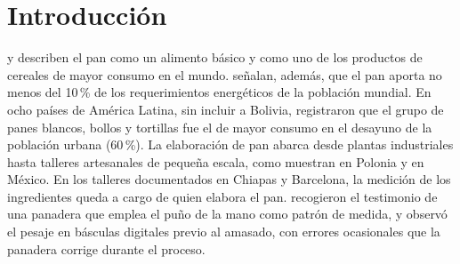 \raggedbottom

\chapter{Introducción}
\label{sec:introduction}


\textcite{ribet2025bread} y \textcite{allipour2023bread} describen el pan
como un alimento básico y como uno de los productos de cereales de mayor
consumo en el mundo. \textcite{ribet2025bread} señalan, además, que el pan
aporta no menos del 10\,\% de los requerimientos energéticos de la población
mundial. En ocho países de América Latina, sin incluir a Bolivia,
\textcite{kovalskys2022breakfast} registraron que el grupo de panes blancos,
bollos y tortillas fue el de mayor consumo en el desayuno de la población
urbana (60\,\%). La elaboración de pan abarca desde plantas industriales
hasta talleres artesanales de pequeña escala, como muestran
\textcite{drozd2023systemic} en Polonia y \textcite{esponda2023saberes} en
México. En los talleres documentados en Chiapas y Barcelona, la medición de
los ingredientes queda a cargo de quien elabora el pan.
\textcite{esponda2023saberes} recogieron el testimonio de una panadera que
emplea el puño de la mano como patrón de medida, y \textcite{rogerio2018sabor}
observó el pesaje en básculas digitales previo al amasado, con errores
ocasionales que la panadera corrige durante el proceso.

